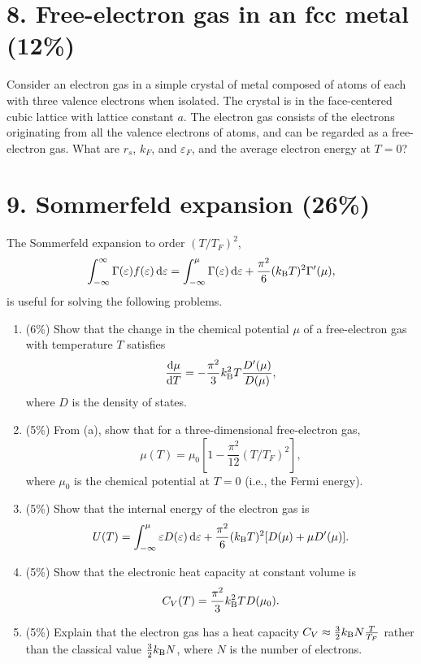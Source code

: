 \section*{8. Free-electron gas in an fcc metal (12\%)}
Consider an electron gas in a simple crystal of metal composed of atoms of each with three valence electrons when isolated. The crystal is in the face-centered cubic lattice with lattice constant $a$. The electron gas consists of the electrons originating from all the valence electrons of atoms, and can be regarded as a free-electron gas. What are $r_s$, $k_F$, and $\varepsilon_F$, and the average electron energy at $T=0$?

\section*{9. Sommerfeld expansion (26\%)}
The Sommerfeld expansion to order $(T/T_F)^2$,
\[
\int_{-\infty}^{\infty}\Gamma(\varepsilon)f(\varepsilon)\mathop{}\!\mathrm{d}\varepsilon
=\int_{-\infty}^{\mu}\Gamma(\varepsilon)\mathop{}\!\mathrm{d}\varepsilon
+\frac{\pi^2}{6}(k_{\mathrm B} T)^2\Gamma'(\mu),
\]
is useful for solving the following problems.
\begin{enumerate}[label=(\alph*)]
\item (6\%) Show that the change in the chemical potential $\mu$ of a free-electron gas with temperature $T$ satisfies
\[
\frac{\mathop{}\!\mathrm{d}\mu}{\mathop{}\!\mathrm{d} T}=-\frac{\pi^2}{3}k_{\mathrm B}^2T\frac{D'(\mu)}{D(\mu)},
\]
where $D$ is the density of states.
\item (5\%) From (a), show that for a three-dimensional free-electron gas,
\[
\mu(T)=\mu_0\left[1-\frac{\pi^2}{12}(T/T_F)^2\right],
\]
where $\mu_0$ is the chemical potential at $T=0$ (i.e., the Fermi energy).
\item (5\%) Show that the internal energy of the electron gas is
\[
U(T)=\int_{-\infty}^{\mu}\varepsilon D(\varepsilon)\mathop{}\!\mathrm{d}\varepsilon
+\frac{\pi^2}{6}(k_{\mathrm B} T)^2[D(\mu)+\mu D'(\mu)].
\]
\item (5\%) Show that the electronic heat capacity at constant volume is
\[
C_V(T)=\frac{\pi^2}{3}k_{\mathrm B}^2T D(\mu_0).
\]
\item (5\%) Explain that the electron gas has a heat capacity
$C_V\approx\frac32k_{\mathrm B} N\frac{T}{T_F}$ rather than the classical value $\frac32k_{\mathrm B} N$, where $N$ is the number of electrons.
\end{enumerate}
